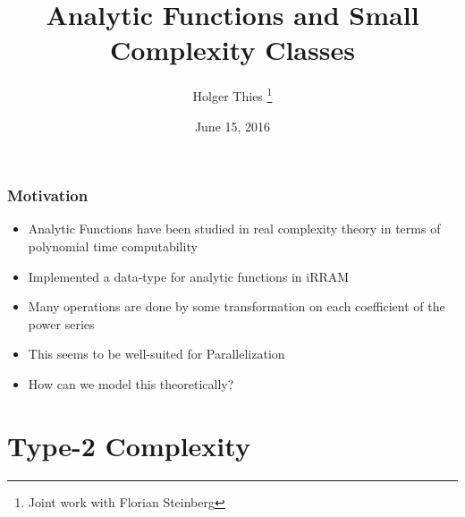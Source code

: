 \documentclass[xcolor=pdftex,dvipsnames,table]{beamer}
\title[Analytic Functions]{Analytic Functions and Small Complexity Classes}
\author[ H. Thies]{
		Holger Thies \footnote{Joint work with Florian Steinberg}
}
\institute[The University of Tokyo]{
  The University of Tokyo
}
\begin{document}
\date{June 15, 2016}
\frame{
\titlepage
}
\frame{
 \tableofcontents 
}
\begin{frame}
  \frametitle{Motivation}
  \begin{itemize}
  \item Analytic Functions have been studied in real complexity theory in terms of polynomial time computability
  \item Implemented a data-type for analytic functions in iRRAM
  \item Many operations are done by some transformation on each coefficient of the power series
  \item This seems to be well-suited for Parallelization
  \item How can we model this theoretically?
  \end{itemize}
 \end{frame}
\section{Type-2 Complexity}
\end{document}
